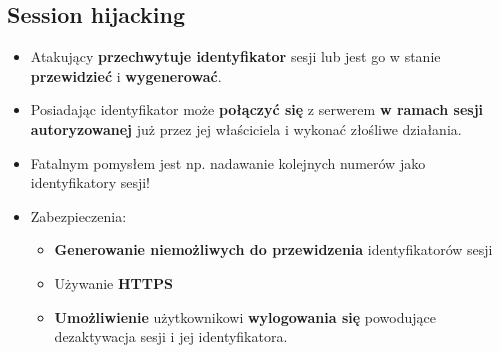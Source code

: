 \documentclass[../main.tex]{subfiles}
\begin{document}
    \subsection{Session hijacking}
    \begin{itemize}
        \item Atakujący \textbf{przechwytuje identyfikator} sesji lub jest go w stanie \textbf{przewidzieć} i
        \textbf{wygenerować}.
        \item Posiadając identyfikator może \textbf{połączyć się} z serwerem \textbf{w ramach sesji
        autoryzowanej} już przez jej właściciela i wykonać złośliwe działania.
        \item Fatalnym pomysłem jest np. nadawanie kolejnych numerów jako identyfikatory sesji!
        \item Zabezpieczenia:
        \begin{itemize}
            \item \textbf{Generowanie niemożliwych do przewidzenia} identyfikatorów sesji
            \item Używanie \textbf{HTTPS}
            \item \textbf{Umożliwienie} użytkownikowi \textbf{wylogowania się} powodujące dezaktywacja sesji
            i jej identyfikatora.
        \end{itemize}
    \end{itemize}
\end{document}
